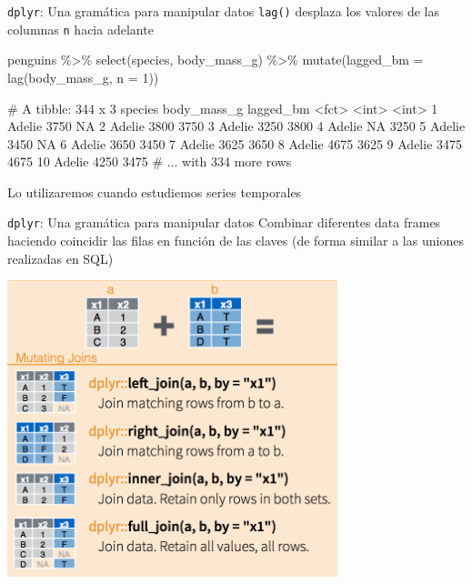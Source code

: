 \documentclass[
  ignorenonframetext,
  aspectratio=169]{beamer}
\newenvironment{Shaded}{\begin{snugshade}}{\end{snugshade}}
\newcommand{\AttributeTok}[1]{\textcolor[rgb]{0.77,0.63,0.00}{#1}}
\newcommand{\DecValTok}[1]{\textcolor[rgb]{0.00,0.00,0.81}{#1}}
\newcommand{\FunctionTok}[1]{\textcolor[rgb]{0.00,0.00,0.00}{#1}}
\newcommand{\NormalTok}[1]{#1}
\newcommand{\SpecialCharTok}[1]{\textcolor[rgb]{0.00,0.00,0.00}{#1}}
\let\oldverbatim\verbatim
\let\endoldverbatim\endverbatim
\renewenvironment{verbatim}{\tiny\oldverbatim}{\endoldverbatim}
\begin{document}
\begin{frame}[fragile]{\texttt{dplyr}: Una gramática para manipular
datos}
\protect\hypertarget{dplyr-una-gramuxe1tica-para-manipular-datos-5}{}
\texttt{lag()} desplaza los valores de las columnas \texttt{n} hacia
adelante

\begin{Shaded}
\begin{Highlighting}[]
\NormalTok{penguins }\SpecialCharTok{\%\textgreater{}\%} \FunctionTok{select}\NormalTok{(species, body\_mass\_g) }\SpecialCharTok{\%\textgreater{}\%} 
  \FunctionTok{mutate}\NormalTok{(}\AttributeTok{lagged\_bm =} \FunctionTok{lag}\NormalTok{(body\_mass\_g, }\AttributeTok{n =} \DecValTok{1}\NormalTok{))}
\end{Highlighting}
\end{Shaded}

\begin{verbatim}
# A tibble: 344 x 3
   species body_mass_g lagged_bm
   <fct>         <int>     <int>
 1 Adelie         3750        NA
 2 Adelie         3800      3750
 3 Adelie         3250      3800
 4 Adelie           NA      3250
 5 Adelie         3450        NA
 6 Adelie         3650      3450
 7 Adelie         3625      3650
 8 Adelie         4675      3625
 9 Adelie         3475      4675
10 Adelie         4250      3475
# ... with 334 more rows
\end{verbatim}

Lo utilizaremos cuando estudiemos series temporales
\end{frame}

\begin{frame}{\texttt{dplyr}: Una gramática para manipular datos}
\protect\hypertarget{dplyr-una-gramuxe1tica-para-manipular-datos-6}{}
Combinar diferentes data frames haciendo coincidir las filas en función
de las claves (de forma similar a las uniones realizadas en SQL)

\begin{center}\includegraphics[width=0.4\linewidth]{Imgs/combinar_tablas} \end{center}
\end{frame}
\end{document}
